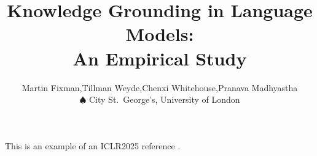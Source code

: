 \documentclass{article}
\title{Knowledge Grounding in Language Models: \\ An Empirical Study}
\author{%
	Martin Fixman\spade{},Tillman Weyde\spade{},Chenxi Whitehouse\spade{},Pranava Madhyastha\spade{} \\
	$\spadesuit{}$ City St.\ George's, University of London%
}
\begin{document}
\maketitle{}

\begin{abstract}
	
\end{abstract}













This is an example of an ICLR2025 reference \citep{survey_hallucinations}.


\end{document}
